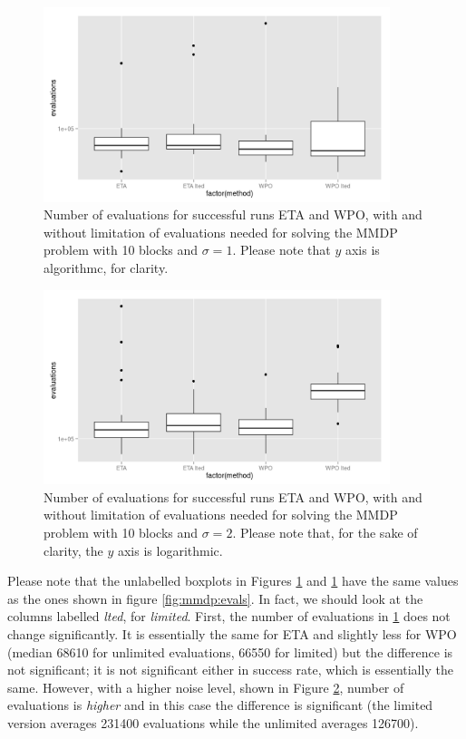 \documentclass{svmult}
\begin{document}
\begin{figure}[!ht] 
\centering
\includegraphics[width=0.9\textwidth]{../images/ns1-MMDP.png}
\caption{Number of evaluations for successful runs ETA and WPO, with
  and without limitation of evaluations needed for solving the MMDP
  problem with 10 blocks and $\sigma=1$. Please note that $y$ axis is
  algorithmc, for clarity. \label{fig:lted:ns1}}
\end{figure}
%
\begin{figure}[!ht] 
\centering
\includegraphics[width=0.9\textwidth]{../images/ns2-MMDP.png}
\caption{Number of evaluations for successful runs ETA and WPO, with
  and without limitation of evaluations needed for solving the MMDP
  problem with 10 blocks and $\sigma=2$. Please note that, for the
  sake of clarity, the $y$ axis is logarithmic.\label{fig:lted:ns2}}
\end{figure}
%
Please note that the unlabelled boxplots in Figures
\ref{fig:lted:ns1} and  \ref{fig:lted:ns1}
have the same values as the ones shown in figure
\ref{fig:mmdp:evals}. In fact, we should look at the columns labelled
{\em lted}, for {\em limited}. First, the number of evaluations in
\ref{fig:lted:ns1} does not change significantly.
 It is essentially
the same for ETA and slightly less for WPO (median 68610 for unlimited
evaluations, 66550 for limited) but the difference is not significant;
it is not significant either in success rate, which is essentially the
same. However, with a higher noise level, shown in Figure
\ref{fig:lted:ns2}, number of evaluations is {\em higher} and in this
case the difference is significant (the limited version averages
231400 evaluations while the unlimited averages 126700). 
\end{document}
